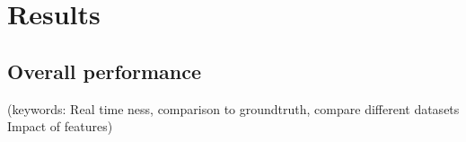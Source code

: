 \section{Results}

\subsection{Overall performance}
(keywords: Real time ness, comparison to groundtruth, compare different datasets
Impact of features)